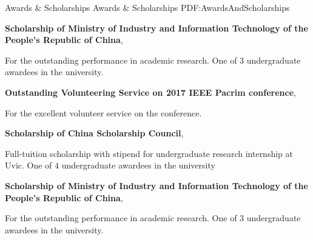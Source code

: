 \documentclass[letterpaper,MMMyyyy,nonstopmode]{simpleresumecv}
\begin{document}
\begin{Body}
\Section
{Awards \&\newline
Scholarships}
{Awards \& Scholarships}
{PDF:AwardsAndScholarships}

\BulletItem
\textbf{Scholarship of Ministry of Industry and Information Technology of the People’s Republic of China},
\hfill
{}
\begin{Detail}
\Item
For the outstanding performance in academic research. One of $3$ undergraduate awardees in the university.
\end{Detail}
\Gap
\BulletItem
\textbf{Outstanding Volunteering Service on 2017 IEEE Pacrim conference},
\hfill
{}
\begin{Detail}
\Item
For the excellent volunteer service on the conference.
\end{Detail}
\Gap
\BulletItem
\textbf{Scholarship of China Scholarship Council},
\hfill
{}
\begin{Detail}
\Item
Full-tuition scholarship with stipend for undergraduate research internship at Uvic. One of $4$ undergraduate awardees in the university
\end{Detail}
\Gap
\BulletItem
\textbf{Scholarship of Ministry of Industry and Information Technology of the People’s Republic of China},
\hfill
{}
\begin{Detail}
\Item
For the outstanding performance in academic research. One of $3$ undergraduate awardees in the university.
\end{Detail}











\end{Body}
\end{document}

